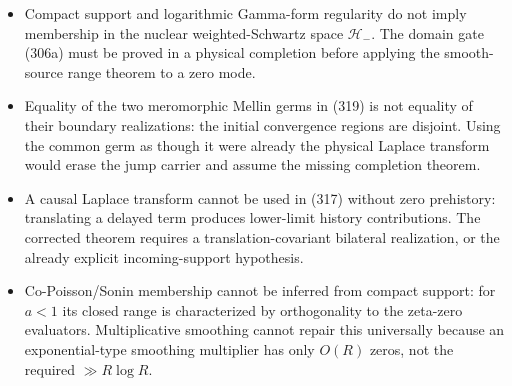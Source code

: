 \documentclass[11pt]{article}
\begin{document}
\begin{itemize}
      the missing positive defect.
\item Compact support and logarithmic Gamma-form regularity do not imply
      membership in the nuclear weighted-Schwartz space $\mathcal H_-$.
      The domain gate (306a) must be proved in a physical completion before
      applying the smooth-source range theorem to a zero mode.
\item Equality of the two meromorphic Mellin germs in (319) is not equality
      of their boundary realizations: the initial convergence regions are
      disjoint.  Using the common germ as though it were already the physical
      Laplace transform would erase the jump carrier and assume the missing
      completion theorem.
\item A causal Laplace transform cannot be used in (317) without zero
      prehistory: translating a delayed term produces lower-limit history
      contributions.  The corrected theorem requires a translation-covariant
      bilateral realization, or the already explicit incoming-support
      hypothesis.
\item Co-Poisson/Sonin membership cannot be inferred from compact support:
      for $a<1$ its closed range is characterized by orthogonality to the
      zeta-zero evaluators.  Multiplicative smoothing cannot repair this
      universally because an exponential-type smoothing multiplier has only
      $O(R)$ zeros, not the required $\gg R\log R$.
\end{itemize}
\end{document}
